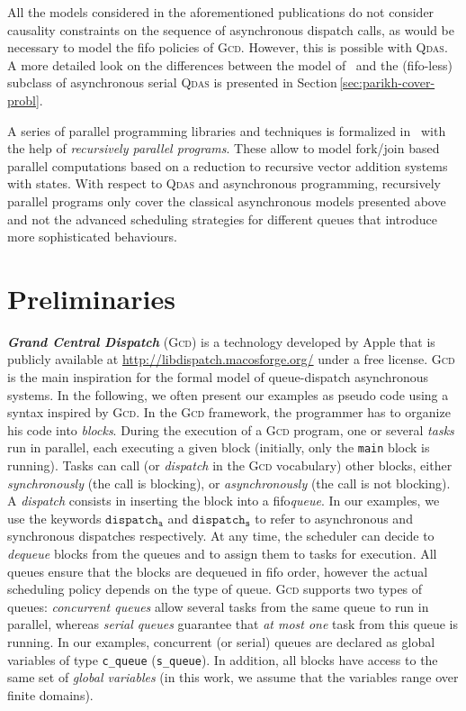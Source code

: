 \documentclass[runningheads,oribibl,]{article}
\newcommand{\cfont}[1]{\ensuremath{\mathtt{#1}}\xspace}
\renewcommand{\gcd}{\textsc{Gcd}\xspace}
\newcommand{\qdas}{\textsc{Qdas}\xspace}
\newcommand{\fifo}{fifo\xspace}
\newcommand{\disps}{\ensuremath{\cfont{dispatch_s}}}
\newcommand{\dispa}{\ensuremath{\cfont{dispatch_a}}}
\begin{document}
All the models considered in the aforementioned publications do not
consider causality constraints on the sequence of asynchronous
dispatch calls, as would be necessary to model the \fifo policies of
\gcd. However, this is possible with \qdas. A more detailed look on
the differences between the model of~\cite{ganty-p-2010--a} and the
(\fifo-less) subclass of asynchronous serial \qdas is presented in
Section\,\ref{sec:parikh-cover-probl}.

A series of parallel programming libraries and techniques is
formalized in~\cite{bouajjani-a-2012--a} with the help of
\emph{recursively parallel programs}. These allow to model fork/join
based parallel computations based on a reduction to recursive vector
addition systems with states. With respect to \qdas and asynchronous
programming, recursively parallel programs only cover the classical
asynchronous models presented above and not the advanced scheduling
strategies for different queues that introduce more sophisticated
behaviours.




\section{Preliminaries}\label{sec:prelims}
\emph{\bf Grand Central Dispatch} (\gcd) is a technology developed by
Apple \cite{apple--2010--a,apple--2011--a} that is publicly available
at \url{http://libdispatch.macosforge.org/} under a free license. \gcd
is the main inspiration for the formal model of queue-dispatch
asynchronous systems. In the following, we often present our examples
as pseudo code using a syntax inspired by \gcd.  In the \gcd
framework, the programmer has to organize his code into
\emph{blocks}. During the execution of a \gcd program, one or several
\emph{tasks} run in parallel, each executing a given block (initially,
only the \texttt{main} block is running). Tasks can call (or
\emph{dispatch} in the \gcd vocabulary) other blocks, either
\emph{synchronously} (the call is blocking), or \emph{asynchronously}
(the call is not blocking). A \emph{dispatch} consists in inserting
the block into a \fifo \emph{queue}. In our examples, we use the
keywords $\dispa$ and $\disps$ to refer to asynchronous and
synchronous dispatches respectively.  At any time, the scheduler can
decide to \emph{dequeue} blocks from the queues and to assign them to
tasks for execution. All queues ensure that the blocks are dequeued in
\fifo order, however the actual scheduling policy depends on the type
of queue. \gcd supports two types of queues: \emph{concurrent queues}
allow several tasks from the same queue to run in parallel, whereas
\emph{serial queues} guarantee that \emph{at most one} task from this
queue is running. In our examples, concurrent (or serial) queues are
declared as global variables of type \texttt{c\_queue}
(\texttt{s\_queue}). In addition, all blocks have access to the same
set of \emph{global variables} (in this work, we assume that the
variables range over finite domains).
\end{document}
